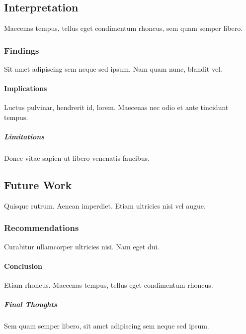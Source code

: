 \documentclass{article}
\begin{document}
\subsection{Interpretation}
Maecenas tempus, tellus eget condimentum rhoncus, sem quam semper libero.

\subsubsection{Findings}
Sit amet adipiscing sem neque sed ipsum. Nam quam nunc, blandit vel.

\paragraph{Implications}
Luctus pulvinar, hendrerit id, lorem. Maecenas nec odio et ante tincidunt tempus.

\subparagraph{Limitations}
Donec vitae sapien ut libero venenatis faucibus.

\subsection{Future Work}
Quisque rutrum. Aenean imperdiet. Etiam ultricies nisi vel augue.

\subsubsection{Recommendations}
Curabitur ullamcorper ultricies nisi. Nam eget dui.

\paragraph{Conclusion}
Etiam rhoncus. Maecenas tempus, tellus eget condimentum rhoncus.

\subparagraph{Final Thoughts}
Sem quam semper libero, sit amet adipiscing sem neque sed ipsum.
\end{document}
